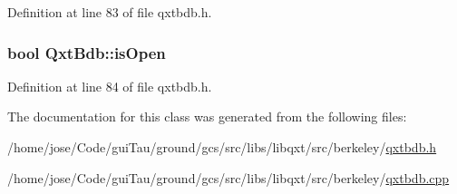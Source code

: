 Definition at line 83 of file qxtbdb.\-h.

\hypertarget{class_qxt_bdb_ab03f345a4070f46d60b940f637b7ecf0}{
\subsubsection[{is\-Open}]{\setlength{\rightskip}{0pt plus 5cm}bool Qxt\-Bdb\-::is\-Open}}\label{class_qxt_bdb_ab03f345a4070f46d60b940f637b7ecf0}


Definition at line 84 of file qxtbdb.\-h.



The documentation for this class was generated from the following files\-:\begin{DoxyCompactItemize}
\item 
/home/jose/\-Code/gui\-Tau/ground/gcs/src/libs/libqxt/src/berkeley/\hyperlink{qxtbdb_8h}{qxtbdb.\-h}\item 
/home/jose/\-Code/gui\-Tau/ground/gcs/src/libs/libqxt/src/berkeley/\hyperlink{qxtbdb_8cpp}{qxtbdb.\-cpp}\end{DoxyCompactItemize}
